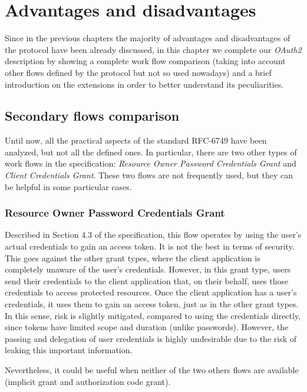 \chapter{Advantages and disadvantages}
Since in the previous chapters the majority of advantages and disadvantages of the protocol have been already discussed, in this chapter we complete our \textit{OAuth2} description by showing a complete work flow comparison (taking into account other flows defined by the protocol but not so used nowadays) and a brief introduction on the extensions in order to better understand its peculiarities. 

\minitoc
\section{Secondary flows comparison}
Until now, all the practical aspects of the standard RFC-6749 \cite{RFC6749} have been analyzed, but not all the defined ones. In particular, there are two other types of work flows in the specification: \textit{Resource Owner Password Credentials Grant} and \textit{Client Credentials Grant}. These two flows are not frequently used, but they can be helpful in some particular cases.

\subsection{Resource Owner Password Credentials Grant}
Described in Section 4.3 of the specification, this flow operates by using the user's actual credentials to gain an access token. It is not the best in terms of security. This goes against the other grant types, where the client application is completely unaware of the user's credentials. However, in this grant type, users send their credentials to the client application that, on their behalf, uses those credentials to access protected resources.
Once the client application has a user's credentials, it uses them to gain an access token, just as in the other grant types. In this sense, risk is slightly mitigated, compared to using the credentials directly, since tokens have limited scope and duration (unlike passwords). However, the passing and delegation of user credentials is highly undesirable due to the risk of leaking this important information.

Nevertheless, it could be useful when neither of the two others flows are available (implicit grant and authorization code grant).

